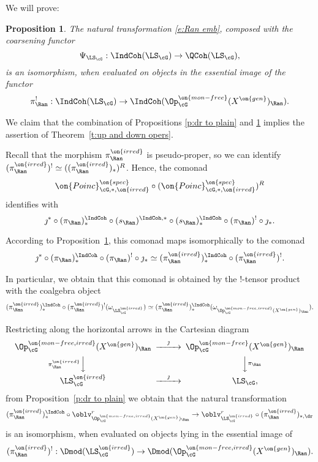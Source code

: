 \documentclass[9pt]{amsart}
\newtheorem{prop}[subsubsection]{Proposition}
\theoremstyle{remark}
\theoremstyle{definition}
\theoremstyle{remark}
\newcommand{\thmref}[1]{Theorem~\ref{#1}}
\newcommand{\propref}[1]{Proposition~\ref{#1}}
\numberwithin{equation}{section}
\begin{document}
We will prove:

\begin{prop} \label{p:Ran emb}
The natural transformation \eqref{e:Ran emb}, composed with the coarsening functor
$$\Psi_{\LS_\cG}:\IndCoh(\LS_\cG)\to \QCoh(\LS_\cG),$$
is an isomorphism, when evaluated on objects
in the essential image of the functor
$$\pi^!_\Ran:\IndCoh(\LS_\cG)\to \IndCoh(\Op^{\on{mon-free}}_\cG(X^{\on{gen}})_\Ran).$$
\end{prop}

\sssec{}

We claim that the combination of Propositions \ref{p:dr to plain} and \ref{p:Ran emb} implies 
the assertion of \thmref{t:up and down opers}. 

\medskip

Recall that the morphism $\pi^{\on{irred}}_\Ran$ is pseudo-proper, so we can identify 
$(\pi^{\on{irred}}_\Ran)^!\simeq ((\pi^{\on{irred}}_\Ran)_*)^R$. Hence, the comonad 
$$\on{Poinc}^{\on{spec}}_{\cG,*,\on{irred}}\circ (\on{Poinc}^{\on{spec}}_{\cG,*,\on{irred}})^R$$
identifies with
$$\jmath^*\circ (\pi_\Ran)^{\IndCoh}_*\circ (s_\Ran)^{\IndCoh,*}\circ (s_\Ran)^{\IndCoh}_*\circ (\pi_\Ran)^!\circ \jmath_*.$$

According to \propref{p:Ran emb}, this comonad maps isomorphically to the comonad
$$\jmath^*\circ (\pi_\Ran)^{\IndCoh}_*\circ  (\pi_\Ran)^!\circ \jmath_*
\simeq (\pi^{\on{irred}}_\Ran)^{\IndCoh}_*\circ (\pi^{\on{irred}}_\Ran)^!.$$

In particular, we obtain that this comonad is obtained by the !-tensor product with the
coalgebra object
\begin{equation} \label{e:IndCoh coalg}
(\pi^{\on{irred}}_\Ran)^{\IndCoh}_*\circ (\pi^{\on{irred}}_\Ran)^!(\omega_{\LS^{\on{irred}}_\cG})\simeq 
(\pi^{\on{irred}}_\Ran)^{\IndCoh}_*(\omega_{\Op^{\on{mon-free,irred}}_\cG(X^{\on{gen}})_\Ran }).
\end{equation}

\sssec{}

Restricting along the horizontal arrows in the Cartesian diagram
$$
\CD
\Op^{\on{mon-free,irred}}_\cG(X^{\on{gen}})_\Ran @>{\jmath}>> \Op^{\on{mon-free}}_\cG(X^{\on{gen}})_\Ran \\
@V{\pi^{\on{irred}}_\Ran}VV @VV{\pi_\Ran}V \\
\LS^{\on{irred}}_\cG @>{\jmath}>> \LS_\cG,
\endCD
$$
from \propref{p:dr to plain} we obtain that the natural transformation 
\begin{equation} \label{e:dr to plain irred}
(\pi^{\on{irred}}_\Ran)^{\IndCoh}_*\circ \oblv_{\Op^{\on{mon-free,irred}}_\cG(X^{\on{gen}})_\Ran}^r\to 
\oblv^r_{\LS^{\on{irred}}_\cG}\circ (\pi^{\on{irred}}_\Ran)_{*,\dr}
\end{equation}
is an isomorphism, when evaluated on objects lying in the essential image of 
$$(\pi^{\on{irred}}_\Ran)^!:\Dmod(\LS^{\on{irred}}_\cG)\to \Dmod(\Op^{\on{mon-free,irred}}_\cG(X^{\on{gen}})_\Ran).$$
\end{document}
